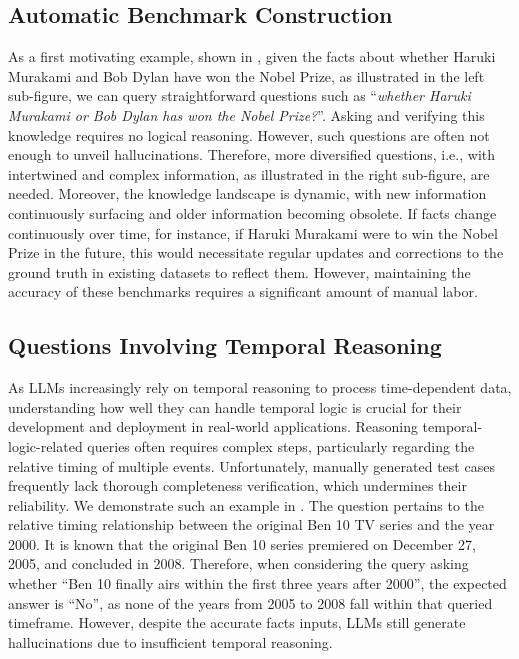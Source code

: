 
\subsection{Automatic Benchmark Construction}
As a first motivating example, shown in , given 
the facts about whether Haruki Murakami and Bob Dylan have won the Nobel Prize, as illustrated in the left sub-figure, we can query straightforward questions such as ``\emph{whether Haruki Murakami or Bob Dylan has won the Nobel Prize?}''. 
Asking and verifying this knowledge requires no logical reasoning. 
However, such questions are often not enough to unveil hallucinations. 
{Therefore, more diversified questions, i.e., with intertwined and complex information, as illustrated in the right sub-figure, are needed.} 
{
Moreover, the knowledge landscape is dynamic, with new information continuously surfacing and older information becoming obsolete.} If facts change continuously over time, for instance, if Haruki Murakami were to win the Nobel Prize in the future, this would necessitate regular updates and corrections to the ground truth in existing datasets to reflect them. However, maintaining the accuracy of these benchmarks requires a significant amount of manual labor. 

\subsection{Questions Involving Temporal Reasoning}
As LLMs increasingly rely on temporal reasoning to process time-dependent data, understanding how well they can handle temporal logic is crucial for their development and deployment in real-world applications. 
Reasoning temporal-logic-related queries often requires complex steps, particularly regarding the relative timing of multiple events. Unfortunately, manually generated test cases frequently lack thorough completeness verification, which undermines their reliability. 
We demonstrate such an example in . 
The question pertains to the relative timing relationship between the original Ben 10 TV series and the year 2000. It is known that the original Ben 10 series premiered on December 27, 2005, and concluded in 2008. Therefore, when considering the query asking whether ``Ben 10 finally airs within the first three years after 2000'', the expected answer is ``No'', as none of the years from 2005 to 2008 fall within that queried timeframe. 
However, despite the accurate facts inputs, LLMs still generate hallucinations due to insufficient temporal reasoning. 





